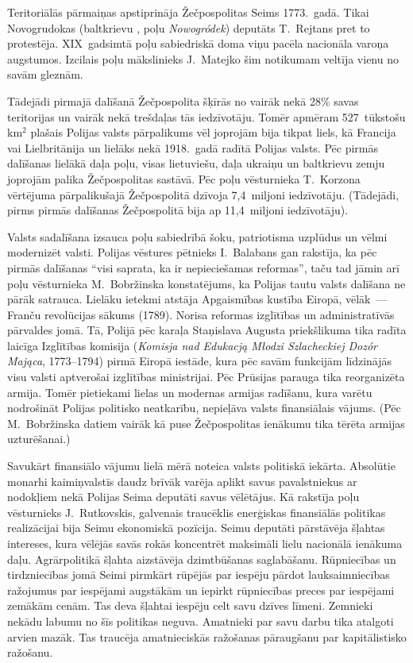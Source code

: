 \documentclass[twoside,a5paper,12pt,fleqn,openany]{extbook}
\newcommand{\pltxti}[1]{\textit{\textpolish{#1}}}
\newcommand{\betxti}[1]{\textit{\textbelarusian{#1}}}
\begin{document}
Teritoriālās pārmaiņas apstiprināja Žečpospolitas Seims 1773.~gadā. Tikai Novogrudokas (baltkrievu \betxti{Навагрудак}, poļu \pltxti{Nowogródek}) deputāts T.~Rejtans pret to protestēja. XIX~gadsimtā poļu sabiedriskā doma viņu pacēla nacionāla varoņa augstumos. Izcilais poļu mākslinieks J.~Matejko šim notikumam veltīja vienu no savām gleznām.

Tādejādi pirmajā dalīšanā Žečpospolita šķīrās no vairāk nekā 28\% savas teritorijas un vairāk nekā trešdaļas tās iedzīvotāju. Tomēr apmēram 527~tūkstošu km$^{2}$ plašais Polijas valsts pārpalikums vēl joprojām bija tikpat liels, kā Francija vai Lielbritānija un lielāks nekā 1918.~gadā radītā Polijas valsts. Pēc pirmās dalīšanas lielākā daļa poļu, visas lietuviešu, daļa ukraiņu un baltkrievu zemju joprojām palika Žečpospolitas sastāvā. Pēc poļu vēsturnieka T.~Korzona vērtējuma pārpalikušajā Žečpospolitā dzīvoja 7,4~miljoni iedzīvotāju. (Tādejādi, pirms pirmās dalīšanas Žečpospolitā bija ap 11,4~miljoni iedzīvotāju).

Valsts sadalīšana izsauca poļu sabiedrībā šoku, patriotisma uzplūdus un vēlmi modernizēt valsti. Polijas vēstures pētnieks I.~Balabans gan rakstīja, ka pēc pirmās dalīšanas ``visi saprata, ka ir nepieciešamas reformas'', taču tad jāmin arī poļu vēsturnieka M.~Bobržinska konstatējums, ka Polijas tautu valsts dalīšana ne pārāk satrauca. Lielāku ietekmi atstāja Apgaismības kustība Eiropā, vēlāk~--- Franču revolūcijas sākums (1789). Norisa reformas izglītības un administratīvās pārvaldes jomā. Tā, Polijā pēc karaļa Staņislava Augusta priekšlikuma tika radīta laicīga Izglītības komisija (\pltxti{Komisja nad Edukacją Młodzi Szlacheckiej Dozór Mająca}, 1773--1794) pirmā Eiropā iestāde, kura pēc savām funkcijām līdzinājās visu valsti aptverošai izglītības ministrijai. Pēc Prūsijas parauga tika reorganizēta armija. Tomēr pietiekami lielas un modernas armijas radīšanu, kura varētu nodrošināt Polijas politisko neatkarību, nepieļāva valsts finansiālais vājums. (Pēc M.~Bobržinska datiem vairāk kā puse Žečpospolitas ienākumu tika tērēta armijas uzturēšanai.)

Savukārt finansiālo vājumu lielā mērā noteica valsts politiskā iekārta. Absolūtie monarhi kaimiņvalstīs daudz brīvāk varēja aplikt savus pavalstniekus ar nodokļiem nekā Polijas Seima deputāti savus vēlētājus. Kā rakstīja poļu vēsturnieks J.~Rutkovskis, galvenais traucēklis enerģiskas finansiālās politikas realizācijai bija Seimu ekonomiskā pozīcija. Seimu deputāti pārstāvēja šļahtas intereses, kura vēlējās savās rokās koncentrēt maksimāli lielu nacionālā ienākuma daļu. Agrārpolitikā šļahta aizstāvēja dzimtbūšanas saglabāšanu. Rūpniecības un tirdzniecības jomā Seimi pirmkārt rūpējās par iespēju pārdot lauksaimniecības ražojumus par iespējami augstākām un iepirkt rūpniecības preces par iespējami zemākām cenām. Tas deva šļahtai iespēju celt savu dzīves līmeni. Zemnieki nekādu labumu no šīs politikas neguva. Amatnieki par savu darbu tika atalgoti arvien mazāk. Tas traucēja amatnieciskās ražošanas pāraugšanu par kapitālistisko ražošanu.
\end{document}
